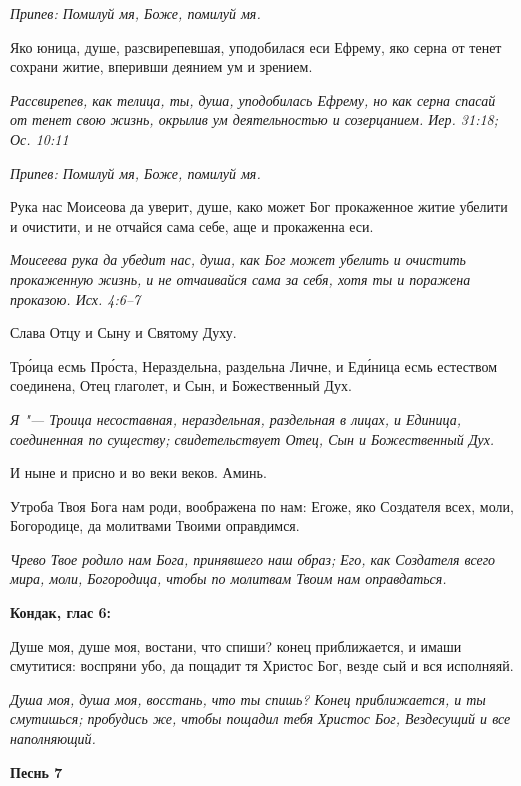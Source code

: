 \itshape Припев:\normalfont{} Помилуй мя, Боже, помилуй мя.


Яко юница, душе, разсвирепевшая, уподобилася еси Ефрему, яко серна от тенет сохрани житие, вперивши деянием ум и зрением.


\itshape Рассвирепев, как телица, ты, душа, уподобилась Ефрему, но как серна спасай от тенет свою жизнь, окрылив ум деятельностью и созерцанием. Иер. 31:18; Ос. 10:11\normalfont{}


\itshape Припев:\normalfont{} Помилуй мя, Боже, помилуй мя.


Рука нас Моисеова да уверит, душе, како может Бог прокаженное житие убелити и очистити, и не отчайся сама себе, аще и прокаженна еси.


\itshape Моисеева рука да убедит нас, душа, как Бог может убелить и очистить прокаженную жизнь, и не отчаивайся сама за себя, хотя ты и поражена проказою. Исх. 4:6–7\normalfont{}


Слава Отцу и Сыну и Святому Духу.


Тро́ица есмь Про́ста, Нераздельна, раздельна Личне, и Еди́ница есмь естеством соединена, Отец глаголет, и Сын, и Божественный Дух.


\itshape Я "--- Троица несоставная, нераздельная, раздельная в лицах, и Единица, соединенная по существу; свидетельствует Отец, Сын и Божественный Дух.\normalfont{}


И ныне и присно и во веки веков. Аминь.


Утроба Твоя Бога нам роди, воображена по нам: Егоже, яко Создателя всех, моли, Богородице, да молитвами Твоими оправдимся.


\itshape Чрево Твое родило нам Бога, принявшего наш образ; Его, как Создателя всего мира, моли, Богородица, чтобы по молитвам Твоим нам оправдаться.\normalfont{}





\bfseries Кондак, глас 6:\normalfont{}


Душе моя, душе моя, востани, что спиши? конец приближается, и имаши смутитися: воспряни убо, да пощадит тя Христос Бог, везде сый и вся исполняяй.


\itshape Душа моя, душа моя, восстань, что ты спишь? Конец приближается, и ты смутишься; пробудись же, чтобы пощадил тебя Христос Бог, Вездесущий и все наполняющий.\normalfont{}





\bfseries Песнь 7\normalfont{}



